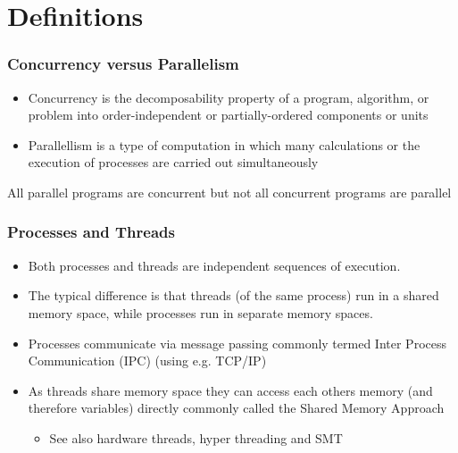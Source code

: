 \documentclass{beamer}
\begin{document}
\section{Definitions}
\begin{frame}
	\frametitle{Concurrency versus Parallelism}
	\begin{itemize}
	\item Concurrency  is the decomposability property of a program, algorithm, or problem into order-independent or partially-ordered components or units
\item Parallellism is a type of computation in which many calculations or the execution of processes are carried out simultaneously

	\end{itemize}
All parallel programs are concurrent but not all concurrent programs are parallel
\end{frame}

\begin{frame}
	\frametitle{Processes and Threads}
	\begin{itemize}
	\item Both processes and threads are independent sequences of execution. 
	\item The typical difference is that threads (of the same process) run in a shared memory space, while processes run in separate memory spaces.
\item Processes communicate via message passing commonly termed Inter Process Communication (IPC) (using e.g. TCP/IP)
\item As threads share memory space they can access each others memory (and therefore variables) directly commonly called the Shared Memory Approach
\begin{itemize}
\item See also hardware threads, hyper threading and SMT
\end{itemize}

	\end{itemize}
	
\end{frame}
\end{document}
